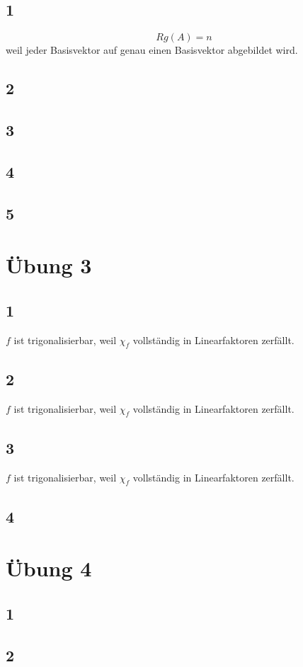 \documentclass[a4paper,10pt]{article}
\begin{document}
\subsection*{1}

\begin{equation}
Rg(A) = n
\end{equation}
weil jeder Basisvektor auf genau einen Basisvektor abgebildet wird.

\subsection*{2}

\subsection*{3}

\subsection*{4}

\subsection*{5}

\section*{Übung 3}

\subsection*{1}

$f$ ist trigonalisierbar, weil $\chi_{f}$ vollständig in Linearfaktoren zerfällt.

\subsection*{2}

$f$ ist trigonalisierbar, weil $\chi_{f}$ vollständig in Linearfaktoren zerfällt.

\subsection*{3}

$f$ ist trigonalisierbar, weil $\chi_{f}$ vollständig in Linearfaktoren zerfällt.

\subsection*{4}

\section*{Übung 4}

\subsection*{1}

\subsection*{2}
\end{document}
